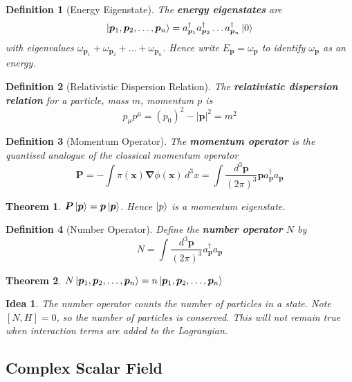 \documentclass{article}
\newtheorem{theorem}{Theorem}[subsection]
\newtheorem{definition}{Definition}[subsection]
\newtheorem*{idea}{Idea}
\newcommand{\grad}{\bm{\nabla}}
\newcommand{\tmeas}{\frac{d^3\bm{p}}{(2\pi)^3}}
\newcommand{\bam}[1]{\textbf{#1}}
\newcommand{\comm}[2][]{\left[ #1, #2 \right]} %
\begin{document}
\begin{definition}[Energy Eigenstate]
The \bam{energy eigenstates} are 
\[
\ket{\bm{p}_1,\bm{p}_2,\dots,\bm{p}_n}=a_{\bm{p}_1}^\dagger a_{\bm{p}_2}^\dagger \dots a_{\bm{p}_n}^\dagger \ket{0}
\]
with eigenvalues $\omega_{\bm{p}_1}+\omega_{\bm{p}_2}+\dots+\omega_{\bm{p}_n}$. Hence write $E_{\bm{p}}=\omega_{\bm{p}}$ to identify $\omega_{\bm{p}}$ as an energy.
\end{definition}

\begin{definition}[Relativistic Dispersion Relation]
The \bam{relativistic dispersion relation} for a particle, mass $m$, momentum $p$ is 
\[
p_\mu p^\mu = (p_0)^2-|\bm{p}|^2=m^2
\]
\end{definition}

\begin{definition}[Momentum Operator]
The \bam{momentum operator} is the quantised analogue of the classical momentum operator 
\[
\bm{P}=-\int \pi(\bm{x}) \grad\phi(\bm{x}) \, d^3x = \int \tmeas \bm{p} a_{\bm{p}}^\dagger a_{\bm{p}}
\]
\end{definition}

\begin{theorem}
$\bm{P}\ket{\bm{p}}=\bm{p}\ket{\bm{p}}$. Hence $\ket{p}$ is a momentum eigenstate. 
\end{theorem}

\begin{definition}[Number Operator]
Define the \bam{number operator} $N$ by 
\[
N=\int \tmeas a_{\bm{p}}^\dagger a_{\bm{p}}
\]
\end{definition}

\begin{theorem}
$N\ket{\bm{p}_1,\bm{p}_2,\dots,\bm{p}_n}=n\ket{\bm{p}_1,\bm{p}_2,\dots,\bm{p}_n}$
\end{theorem}

\begin{idea}
The number operator counts the number of particles in a state. Note $\comm[N]{H}=0$, so the number of particles is conserved. This will not remain true when interaction terms are added to the Lagrangian. 
\end{idea}

\subsection{Complex Scalar Field}
\end{document}
